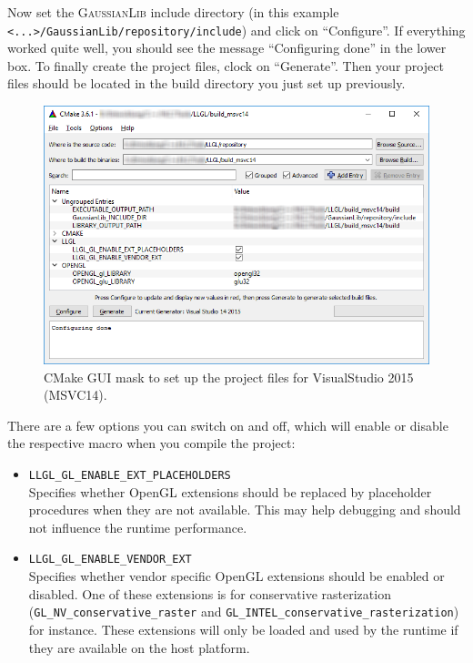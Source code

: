 \documentclass{article}
\begin{document}
Now set the \textsc{GaussianLib} include directory (in this example \texttt{<...>/GaussianLib/repository/include})
and click on ``Configure''. If everything worked quite well, you should see the message ``Configuring done''
in the lower box. To finally create the project files, clock on ``Generate''.
Then your project files should be located in the build directory you just set up previously.

\begin{figure}[H]
	\centering
	\includegraphics[width=0.9 \textwidth]{cmake_mask1}
	\caption{CMake GUI mask to set up the project files for VisualStudio 2015 (MSVC14).}
	\label{fig:cmake_mask1}
\end{figure}

There are a few options you can switch on and off, which will enable or disable the respective macro
when you compile the project:
\begin{itemize}
	\item \texttt{LLGL\_GL\_ENABLE\_EXT\_PLACEHOLDERS} \\
	Specifies whether OpenGL extensions should be replaced by placeholder procedures
	when they are not available. This may help debugging and should not influence the runtime performance.
	
	\item \texttt{LLGL\_GL\_ENABLE\_VENDOR\_EXT} \\
	Specifies whether vendor specific OpenGL extensions should be enabled or disabled.
	One of these extensions is for conservative rasterization
	(\texttt{GL\_NV\_conservative\_raster} and \texttt{GL\_INTEL\_conservative\_rasterization}) for instance.
	These extensions will only be loaded and used by the runtime if they are available on the host platform.
\end{itemize}
\end{document}
